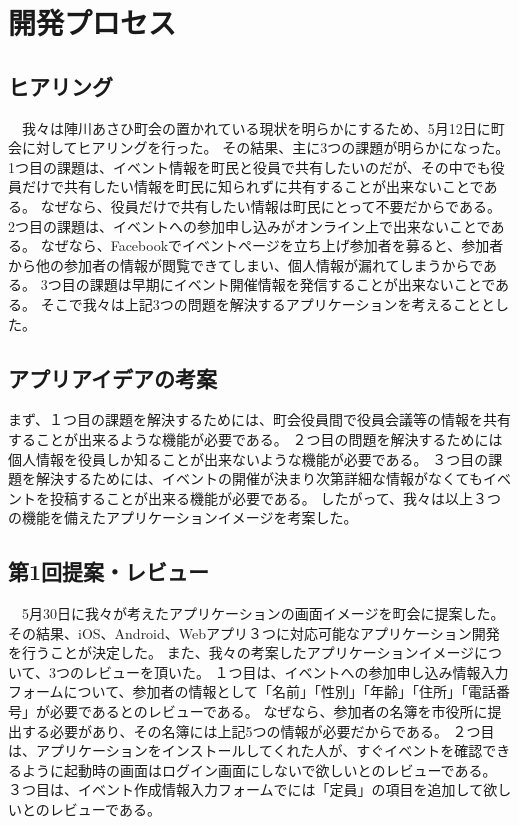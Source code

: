 \chapter{開発プロセス}

\section{ヒアリング}%
　我々は陣川あさひ町会の置かれている現状を明らかにするため、5月12日に町会に対してヒアリングを行った。
その結果、主に3つの課題が明らかになった。
1つ目の課題は、イベント情報を町民と役員で共有したいのだが、その中でも役員だけで共有したい情報を町民に知られずに共有することが出来ないことである。
なぜなら、役員だけで共有したい情報は町民にとって不要だからである。
2つ目の課題は、イベントへの参加申し込みがオンライン上で出来ないことである。
なぜなら、Facebookでイベントページを立ち上げ参加者を募ると、参加者から他の参加者の情報が閲覧できてしまい、個人情報が漏れてしまうからである。
3つ目の課題は早期にイベント開催情報を発信することが出来ないことである。
そこで我々は上記3つの問題を解決するアプリケーションを考えることとした。

\section{アプリアイデアの考案}
まず、１つ目の課題を解決するためには、町会役員間で役員会議等の情報を共有することが出来るような機能が必要である。
２つ目の問題を解決するためには個人情報を役員しか知ることが出来ないような機能が必要である。
３つ目の課題を解決するためには、イベントの開催が決まり次第詳細な情報がなくてもイベントを投稿することが出来る機能が必要である。
したがって、我々は以上３つの機能を備えたアプリケーションイメージを考案した。

\section{第1回提案・レビュー}
　5月30日に我々が考えたアプリケーションの画面イメージを町会に提案した。
その結果、iOS、Android、Webアプリ３つに対応可能なアプリケーション開発を行うことが決定した。
また、我々の考案したアプリケーションイメージについて、3つのレビューを頂いた。
１つ目は、イベントへの参加申し込み情報入力フォームについて、参加者の情報として「名前」「性別」「年齢」「住所」「電話番号」が必要であるとのレビューである。
なぜなら、参加者の名簿を市役所に提出する必要があり、その名簿には上記5つの情報が必要だからである。
２つ目は、アプリケーションをインストールしてくれた人が、すぐイベントを確認できるように起動時の画面はログイン画面にしないで欲しいとのレビューである。
３つ目は、イベント作成情報入力フォームでには「定員」の項目を追加して欲しいとのレビューである。

